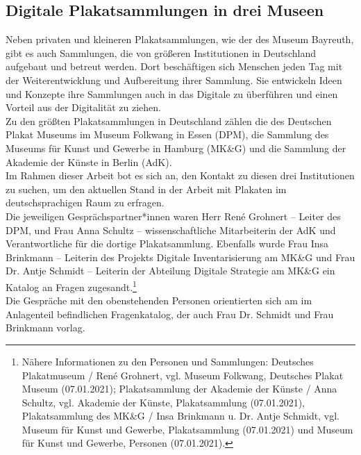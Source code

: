 \documentclass[a4paper,12pt,ngerman]{article}
\begin{document}
\subsection{Digitale Plakatsammlungen in drei Museen}
Neben privaten und kleineren Plakatsammlungen, wie der des Museum Bayreuth, gibt es auch Sammlungen, die von größeren Institutionen in Deutschland aufgebaut und betreut werden. Dort beschäftigen sich Menschen jeden Tag mit der Weiterentwicklung und Aufbereitung ihrer Sammlung. Sie entwickeln Ideen und Konzepte ihre Sammlungen auch in das Digitale zu überführen und einen Vorteil aus der Digitalität zu ziehen. \\
Zu den größten Plakatsammlungen in Deutschland zählen die des Deutschen Plakat Museums im Museum Folkwang in Essen (DPM), die Sammlung des Museums für Kunst und Gewerbe in Hamburg (MK\&G) und die Sammlung der Akademie der Künste in Berlin (AdK). \\
Im Rahmen dieser Arbeit bot es sich an, den Kontakt zu diesen drei Institutionen zu suchen, um den aktuellen Stand in der Arbeit mit Plakaten im deutschsprachigen Raum zu erfragen. \\
Die jeweiligen Gesprächspartner*innen waren Herr René Grohnert -- Leiter des DPM, und Frau Anna Schultz -- wissenschaftliche Mitarbeiterin der AdK und Verantwortliche für die dortige Plakatsammlung. Ebenfalls wurde Frau Insa Brinkmann -- Leiterin des Projekts Digitale Inventarisierung am MK\&G und Frau Dr. Antje Schmidt -- Leiterin der Abteilung Digitale Strategie am MK\&G ein Katalog an Fragen zugesandt.\footnote{Nähere Informationen zu den Personen und Sammlungen: Deutsches Plakatmuseum / René Grohnert, vgl. Museum Folkwang, Deutsches Plakat Museum (07.01.2021); Plakatsammlung der Akademie der Künste / Anna Schultz, vgl. Akademie der Künste, Plakatsammlung (07.01.2021), Plakatsammlung des MK\&G / Insa Brinkmann u. Dr. Antje Schmidt, vgl. Museum für Kunst und Gewerbe, Plakatsammlung (07.01.2021) und Museum für Kunst und Gewerbe, Personen (07.01.2021).} \\
Die Gespräche mit den obenstehenden Personen orientierten sich am im Anlagenteil befindlichen Fragenkatalog, der auch Frau Dr. Schmidt und Frau Brinkmann vorlag. \\
\end{document}
